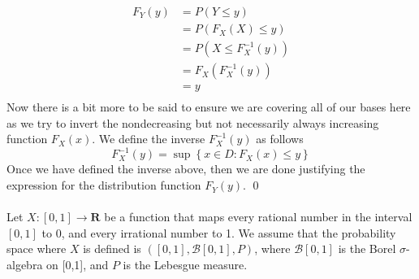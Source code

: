 \documentclass[10pt]{amsart}
\begin{document}
\begin{align*}
F_Y(y) &= P(Y \leq y) \\
	   &= P(F_X(X) \leq y) \\
	   &= P(X \leq F_X^{-1}(y)) \\
	   &= F_X(F_X^{-1}(y)) \\
	   &= y \\
\end{align*}
Now there is a bit more to be said to ensure we are covering all of our bases here as we try to invert the nondecreasing but not necessarily always increasing function $F_X(x)$.
We define the inverse $F_X^{-1}(y)$ as follows
$$F_X^{-1}(y) = \sup \left\{x \in D : F_X(x) \leq y \right\}$$
Once we have defined the inverse above, then we are done justifying the expression for the distribution function $F_Y(y)$.
\qed
\\
\\

  Let $X: [0,1] \to \mathbf{R}$ be a function that maps every rational number in the interval $[0,1]$ to 0, and every irrational number to 1. We assume that the probability space where $X$ is defined is $([0,1],\mathcal{B}[0,1],P)$, where $\mathcal{B}[0,1]$ is the Borel $\sigma$-algebra on [0,1], and $P$ is the Lebesgue measure. 
\end{document}
